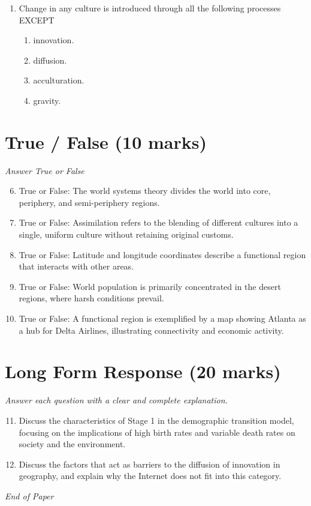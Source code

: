 \documentclass[12pt]{article}
\begin{document}
\begin{enumerate}[label=\arabic*.]
\begin{enumerate}[label=(\alph*)]
    \item replace agribusiness as the main focus of global food production.
\end{enumerate}
\item Change in any culture is introduced through all the following processes EXCEPT
\begin{enumerate}[label=(\alph*)]
    \item innovation.
    \item diffusion.
    \item acculturation.
    \item gravity.
\end{enumerate}
\end{enumerate}

\section*{True / False (10 marks)}
\textit{Answer True or False}
\begin{enumerate}[label=\arabic*.]
\setcounter{enumi}{5}
\item True or False: The world systems theory divides the world into core, periphery, and semi-periphery regions.
\item True or False: Assimilation refers to the blending of different cultures into a single, uniform culture without retaining original customs.
\item True or False: Latitude and longitude coordinates describe a functional region that interacts with other areas.
\item True or False: World population is primarily concentrated in the desert regions, where harsh conditions prevail.
\item True or False: A functional region is exemplified by a map showing Atlanta as a hub for Delta Airlines, illustrating connectivity and economic activity.
\end{enumerate}

\section*{Long Form Response (20 marks)}
\textit{Answer each question with a clear and complete explanation.}
\begin{enumerate}[label=\arabic*.]
\setcounter{enumi}{10}
\item Discuss the characteristics of Stage 1 in the demographic transition model, focusing on the implications of high birth rates and variable death rates on society and the environment.
\item Discuss the factors that act as barriers to the diffusion of innovation in geography, and explain why the Internet does not fit into this category.
\end{enumerate}

\vfill
\noindent\textit{End of Paper}
\end{document}
